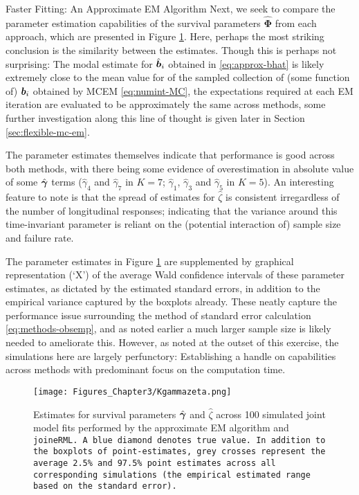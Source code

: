 \begin{chapter}{\label{cha:approx}Faster Fitting: An Approximate EM Algorithm}
  Next, we seek to compare the parameter estimation capabilities of the survival parameters $\hat{\bm{\Phi}}$ from each approach, which are presented in Figure \ref{fig:approx-comparisons-estimates}. Here, perhaps the most striking conclusion is the similarity between the estimates. Though this is perhaps not surprising: The modal estimate for $\hat{\bm{b}}_i$ obtained in \eqref{eq:approx-bhat} is likely extremely close to the mean value for of the sampled collection of (some function of) $\bm{b}_i$ obtained by MCEM \eqref{eq:numint-MC}, \ie the expectations required at each EM iteration are evaluated to be approximately the same across methods, some further investigation along this line of thought is given later in Section \ref{sec:flexible-mc-em}.
  
  The parameter estimates themselves indicate that performance is good across both methods, with there being some evidence of overestimation in absolute value of some $\hat{\bm{\gamma}}$ terms (\eg $\hat{\gamma}_4$ and $\hat{\gamma}_7$ in $K=7$; $\hat{\gamma}_1$, $\hat{\gamma}_3$ and $\hat{\gamma}_5$ in $K=5$). An interesting feature to note is that the spread of estimates for $\hat{\zeta}$ is consistent irregardless of the number of longitudinal responses; indicating that the variance around this time-invariant parameter is reliant on the (potential interaction of) sample size and failure rate. 
  
  The parameter estimates in Figure \ref{fig:approx-comparisons-estimates} are supplemented by graphical representation (`X') of the average Wald confidence intervals of these parameter estimates, as dictated by the estimated standard errors, in addition to the empirical variance captured by the boxplots already. These neatly capture the performance issue surrounding the method of standard error calculation \eqref{eq:methods-obsemp}, and as noted earlier a much larger sample size is likely needed to ameliorate this. However, as noted at the outset of this exercise, the simulations here are largely perfunctory: Establishing a handle on capabilities across methods with predominant focus on the computation time.

  \begin{figure}
      \centering
      \texttt{[image: Figures\_Chapter3/Kgammazeta.png]}
      \caption{Estimates for survival parameters $\hat{\bm{\gamma}}$ and $\hat{\zeta}$ across 100 simulated joint model fits performed by the approximate EM algorithm and \tt{joineRML}. A blue diamond denotes true value. In addition to the boxplots of point-estimates, grey crosses represent the average 2.5\% and 97.5\% point estimates across all corresponding simulations (\ie the empirical estimated range based on the standard error).}
      \label{fig:approx-comparisons-estimates}
  \end{figure}


\end{chapter}
